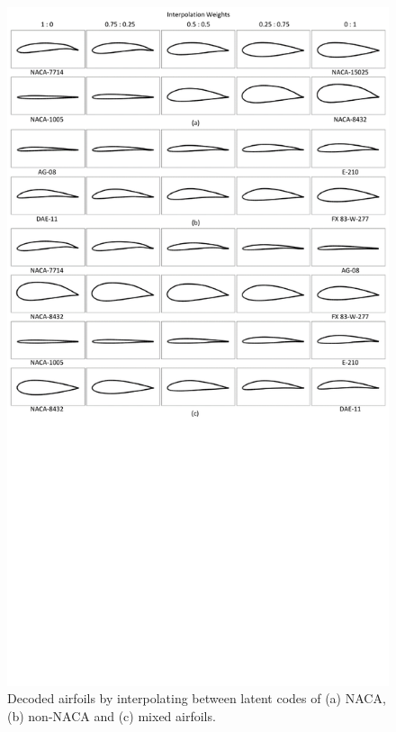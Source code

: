 \begin{figure}[!htb]
	\begin{center}
		\includegraphics[width=1\linewidth]{chapter3/tex/figures/experiment/latent_interpolation.pdf}
	\end{center}
	\caption{
		\small Decoded airfoils by interpolating between latent codes of (a) NACA, (b) non-NACA and (c) mixed airfoils.
	}
	\label{ch3:fig:discuss_latent_interp}
\end{figure}


